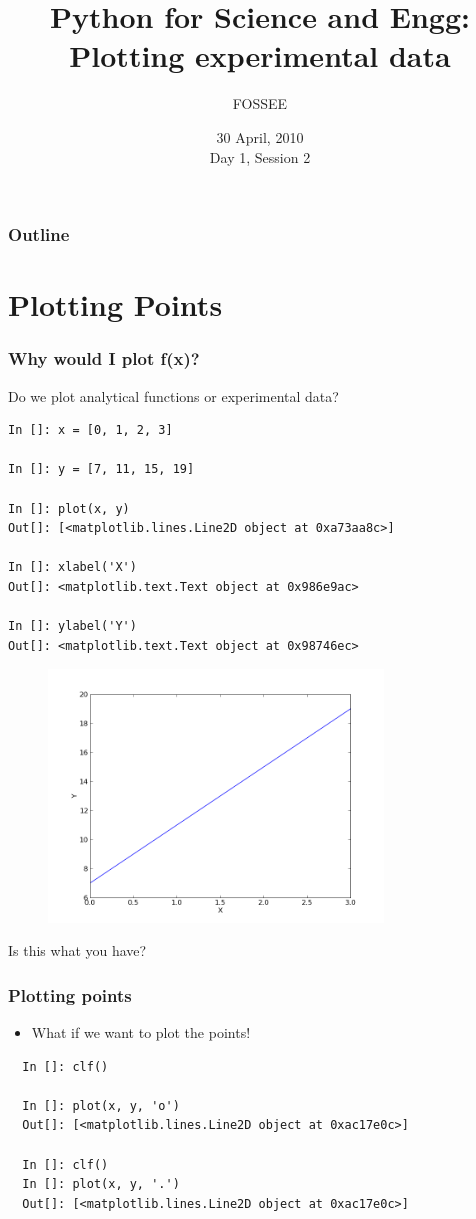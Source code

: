 \documentclass[14pt,compress]{beamer}
\title[Plotting with Python]{Python for Science and Engg: Plotting experimental data}
\author[FOSSEE] {FOSSEE}
\institute[IIT Bombay] {Department of Aerospace Engineering\\IIT Bombay}
\date[] {30 April, 2010\\Day 1, Session 2}
\begin{document}
\begin{frame}
  \titlepage
\end{frame}

\begin{frame}
  \frametitle{Outline}
  \tableofcontents
\end{frame}

\section{Plotting Points}
\begin{frame}[fragile]
\frametitle{Why would I plot f(x)?}
Do we plot analytical functions or experimental data?
\begin{small}
\begin{lstlisting}
In []: x = [0, 1, 2, 3]

In []: y = [7, 11, 15, 19]

In []: plot(x, y)
Out[]: [<matplotlib.lines.Line2D object at 0xa73aa8c>]

In []: xlabel('X')
Out[]: <matplotlib.text.Text object at 0x986e9ac>

In []: ylabel('Y')
Out[]: <matplotlib.text.Text object at 0x98746ec>
\end{lstlisting}
\end{small}
\end{frame}

\begin{frame}[fragile]
\begin{figure}
\includegraphics[width=3.5in]{data/straightline.png}
\end{figure}
\alert{Is this what you have?}
\end{frame}

\begin{frame}[fragile]
\frametitle{Plotting points}
\begin{itemize}
\item What if we want to plot the points!
\end{itemize}
\begin{lstlisting}
  In []: clf()

  In []: plot(x, y, 'o')
  Out[]: [<matplotlib.lines.Line2D object at 0xac17e0c>]

  In []: clf()
  In []: plot(x, y, '.')
  Out[]: [<matplotlib.lines.Line2D object at 0xac17e0c>]
\end{lstlisting}
\end{frame}
\end{document}
